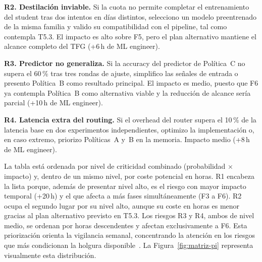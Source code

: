 \documentclass[11pt,a4paper]{article}
\begin{document}
\textbf{R2. Destilación inviable.} Si la cuota no permite completar el entrenamiento del student tras dos intentos en días distintos, selecciono un modelo preentrenado de la misma familia y valido su compatibilidad con el pipeline, tal como contempla T5.3. El impacto es alto sobre F5, pero el plan alternativo mantiene el alcance completo del TFG (+6\,h de ML engineer).

\textbf{R3. Predictor no generaliza.} Si la accuracy del predictor de Política~C no supera el 60\,\% tras tres rondas de ajuste, simplifico las señales de entrada o presento Política~B como resultado principal. El impacto es medio, puesto que F6 ya contempla Política~B como alternativa viable y la reducción de alcance sería parcial (+10\,h de ML engineer).

\textbf{R4. Latencia extra del routing.} Si el overhead del router supera el 10\,\% de la latencia base en dos experimentos independientes, optimizo la implementación o, en caso extremo, priorizo Políticas~A y~B en la memoria. Impacto medio (+8\,h de ML engineer).

La tabla está ordenada por nivel de criticidad combinado (probabilidad $\times$ impacto) y, dentro de un mismo nivel, por coste potencial en horas. R1 encabeza la lista porque, además de presentar nivel alto, es el riesgo con mayor impacto temporal (+20\,h) y el que afecta a más fases simultáneamente (F3 a F6). R2 ocupa el segundo lugar por su nivel alto, aunque su coste en horas es menor gracias al plan alternativo previsto en T5.3. Los riesgos R3 y R4, ambos de nivel medio, se ordenan por horas descendentes y afectan exclusivamente a F6. Esta priorización orienta la vigilancia semanal, concentrando la atención en los riesgos que más condicionan la holgura disponible~\cite{pmbok}. La Figura~\ref{fig:matriz-pi} representa visualmente esta distribución.
\end{document}
